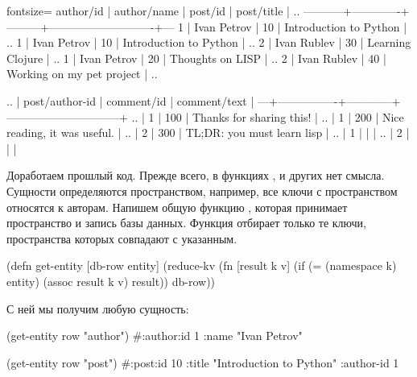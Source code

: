 \begin{english}
  \begin{text*}{fontsize=\small}
 author/id | author/name | post/id |         post/title         | ..
-----------+-------------+---------+----------------------------+---
         1 | Ivan Petrov |      10 | Introduction to Python     | ..
         1 | Ivan Petrov |      10 | Introduction to Python     | ..
         2 | Ivan Rublev |      30 | Learning Clojure           | ..
         1 | Ivan Petrov |      20 | Thoughts on LISP           | ..
         2 | Ivan Rublev |      40 | Working on my pet project  | ..

.. | post/author-id | comment/id |         comment/text         |
---+----------------+------------+------------------------------+
.. |              1 |        100 | Thanks for sharing this!     |
.. |              1 |        200 | Nice reading, it was useful. |
.. |              2 |        300 | TL;DR: you must learn lisp   |
.. |              1 |            |                              |
.. |              2 |            |                              |
  \end{text*}
\end{english}

Доработаем прошлый код. Прежде всего, в функциях ,  и других нет смысла. Сущности определяются пространством, например, все ключи с пространством  относятся к авторам. Напишем общую функцию , которая принимает пространство и запись базы данных. Функция отбирает только те ключи, пространства которых совпадают с указанным.

\begin{english}
  \begin{clojure}
(defn get-entity [db-row entity]
  (reduce-kv
   (fn [result k v]
     (if (= (namespace k) entity)
       (assoc result k v)
       result))
   {}
   db-row))
  \end{clojure}
\end{english}

С ней мы получим любую сущность:

\begin{english}
  \begin{clojure}
(get-entity row "author")
#:author{:id 1 :name "Ivan Petrov"}

(get-entity row "post")
#:post{:id 10
       :title "Introduction to Python"
       :author-id 1}
  \end{clojure}
\end{english}

